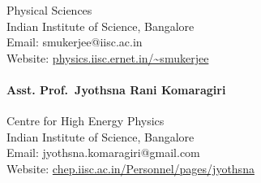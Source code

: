 \documentclass[
  a4paper,
  11pt,
  oneside]{article}
\let\oldparagraph\paragraph
\renewcommand{\paragraph}[1]{\oldparagraph{#1}\mbox{}}
\begin{document}
Physical Sciences\\
Indian Institute of Science, Bangalore\\
Email: smukerjee@iisc.ac.in\\
Website:
\href{http://physics.iisc.ernet.in/~smukerjee}{physics.iisc.ernet.in/\textasciitilde smukerjee}

\hypertarget{asst.-prof.-jyothsna-rani-komaragiri}{%
\paragraph{Asst. Prof.~Jyothsna Rani
Komaragiri}\label{asst.-prof.-jyothsna-rani-komaragiri}}

Centre for High Energy Physics\\
Indian Institute of Science, Bangalore\\
Email: jyothsna.komaragiri@gmail.com\\
Website:
\href{http://chep.iisc.ac.in/Personnel/pages/jyothsna}{chep.iisc.ac.in/Personnel/pages/jyothsna}
\end{document}
